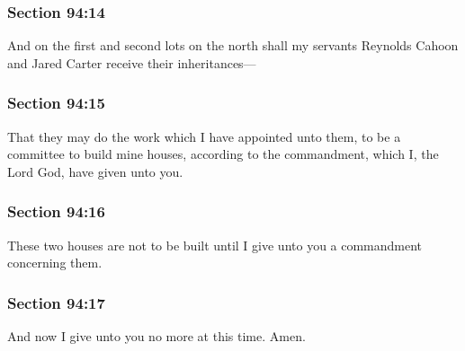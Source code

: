 	\subsubsection{Section 94:14} %
		\label{DC94-14}

		And on the first and second lots on the north shall my servants Reynolds Cahoon and Jared Carter receive their inheritances---


	\subsubsection{Section 94:15} %
		\label{DC94-15}

		That they may do the work which I have appointed unto them, to be a committee to build mine houses, according to the commandment, which I, the Lord God, have given unto you.


	\subsubsection{Section 94:16} %
		\label{DC94-16}

		These two houses are not to be built until I give unto you a commandment concerning them.


	\subsubsection{Section 94:17} %
		\label{DC94-17}

		And now I give unto you no more at this time.  Amen.

